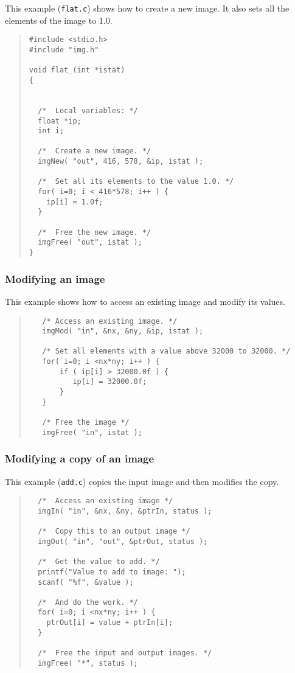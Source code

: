 \documentclass[twoside,11pt]{article}
\newcommand{\htmladdnormallink}[2]{#1}
\renewcommand{\_}{\texttt{\symbol{95}}}
\newcommand{\myverb}[1]{{\texttt{#1}}}
\newenvironment{code}{\begin{small} \begin{quote}}
                     {\end{quote} \end{small}}
\begin{document}
This example
(\htmladdnormallink{\myverb{flat.c}}{../../bin/examples/img/flat.c})
shows how to create a new image. It also sets all the elements of the
image to 1.0.

\begin{code}
\begin{verbatim}
#include <stdio.h>
#include "img.h"

void flat_(int *istat)
{


  /*  Local variables: */
  float *ip;
  int i;

  /*  Create a new image. */
  imgNew( "out", 416, 578, &ip, istat );

  /*  Set all its elements to the value 1.0. */
  for( i=0; i < 416*578; i++ ) {
    ip[i] = 1.0f;
  }

  /*  Free the new image. */
  imgFree( "out", istat );
}
\end{verbatim}
\end{code}

\subsubsection{Modifying an image}
This example shows how to access an existing image and modify
its values.
\begin{code}
\begin{verbatim}
   /* Access an existing image. */
   imgMod( "in", &nx, &ny, &ip, istat );

   /* Set all elements with a value above 32000 to 32000. */
   for( i=0; i <nx*ny; i++ ) {
       if ( ip[i] > 32000.0f ) {
          ip[i] = 32000.0f;
       }
   }

   /* Free the image */
   imgFree( "in", istat );
\end{verbatim}
\end{code}

\subsubsection{Modifying a copy of an image}
This example
(\htmladdnormallink{\myverb{add.c}}{../../bin/examples/img/add.c})
copies the input image and then modifies the copy.
\begin{code}
\begin{verbatim}
  /*  Access an existing image */
  imgIn( "in", &nx, &ny, &ptrIn, status );

  /*  Copy this to an output image */
  imgOut( "in", "out", &ptrOut, status );

  /*  Get the value to add. */
  printf("Value to add to image: ");
  scanf( "%f", &value );

  /*  And do the work. */
  for( i=0; i <nx*ny; i++ ) {
    ptrOut[i] = value + ptrIn[i];
  }

  /*  Free the input and output images. */
  imgFree( "*", status );
\end{verbatim}
\end{code}
\end{document}
